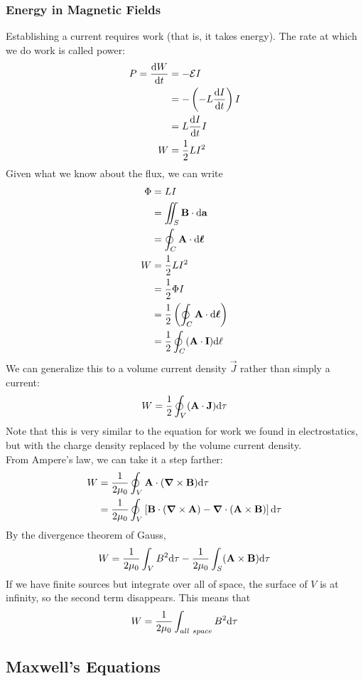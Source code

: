 \documentclass[a4paper]{article}
\begin{document}
\subsubsection{Energy in Magnetic Fields}
Establishing a current requires work (that is, it takes energy). The rate at
which we do work is called power:
\begin{align*}
	P = \frac{\mathrm{d} W}{\mathrm{d} t} &= -\mathcal{E} I\\
		       &= -\left(-L\frac{\mathrm{d} I}{\mathrm{d} t}\right)I\\
		       &= L\frac{\mathrm{d} I}{\mathrm{d} t} I\\
	W &= \frac{1}{2}LI^2
\end{align*}
Given what we know about the flux, we can write
\begin{align*}
	\Phi &= LI\\
	     &= \iint_S \boldsymbol{\mathbf{B}} \cdot \mathrm{d}\boldsymbol{\mathbf{a}}\\
	     &= \oint_C \boldsymbol{\mathbf{A}} \cdot \mathrm{d}\boldsymbol{\mathbf{\ell}}\\
	W &= \frac{1}{2}LI^2\\
	  &= \frac{1}{2}\Phi I\\
	  &= \frac{1}{2}\left(\oint_C \boldsymbol{\mathbf{A}} \cdot \mathrm{d}\boldsymbol{\mathbf{\ell}}\right)\\
	  &= \frac{1}{2}\oint_C(\boldsymbol{\mathbf{A}} \cdot \boldsymbol{\mathbf{I}}) \mathrm{d}\ell
\end{align*}
We can generalize this to a volume current density $\vec{J}$ rather than
simply a current:
\[ W = \frac{1}{2}\oint_V (\boldsymbol{\mathbf{A}} \cdot \boldsymbol{\mathbf{J}}) \mathrm{d}\tau \]
Note that this is very similar to the equation for work we found in
electrostatics, but with the charge density replaced by the volume current
density.\\
From Ampere's law, we can take it a step farther:
\begin{align*}
	W &= \frac{1}{2\mu_0}\oint_V \boldsymbol{\mathbf{A}} \cdot(\boldsymbol{\mathbf{\nabla}} \times \boldsymbol{\mathbf{B}})\mathrm{d}\tau\\
	  &= \frac{1}{2\mu_0}\oint_V\left[
		\boldsymbol{\mathbf{B}}\cdot(\boldsymbol{\mathbf{\nabla}}\times\boldsymbol{\mathbf{A}}) -
		\boldsymbol{\mathbf{\nabla}}\cdot(\boldsymbol{\mathbf{A}}\times\boldsymbol{\mathbf{B}})\right]\mathrm{d}\tau
\end{align*}
By the divergence theorem of Gauss,
\[ W = \frac{1}{2\mu_0}\int_V B^2\mathrm{d}\tau -
	\frac{1}{2\mu_0}\int_S (\boldsymbol{\mathbf{A}} \times \boldsymbol{\mathbf{B}})\mathrm{d}\tau \]
If we have finite sources but integrate over all of space, the surface of $V$
is at infinity, so the second term disappears. This means that
\[ W = \frac{1}{2\mu_0} \int_{all\ space}B^2\d\tau \]

\subsection{Maxwell's Equations}
\end{document}
